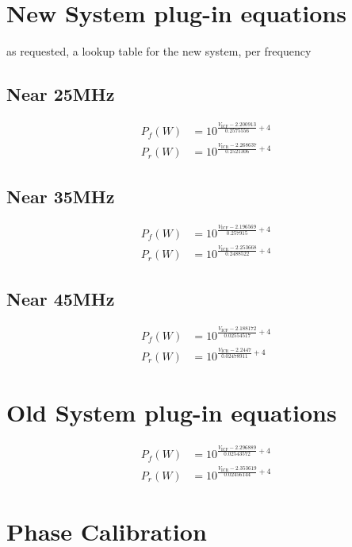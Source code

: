 \documentclass{report}
\begin{document}
\section{New System plug-in equations}
as requested, a lookup table for the new system, per frequency
\subsection{Near 25MHz}
\begin{eqnarray}
    P_f(W) &= 10^{\frac{V_{\text{ICF}}-2.200913}{0.2575556}+ 4}\\
    P_r(W) &= 10^{\frac{V_{\text{ICR}}-2.268637}{0.2521306}+ 4}
\end{eqnarray}
\subsection{Near 35MHz}
\begin{eqnarray}
    P_f(W) &= 10^{\frac{V_{\text{ICF}}-2.196569}{0.257915} + 4}\\
    P_r(W) &= 10^{\frac{V_{\text{ICR}}-2.253668}{0.2488522} + 4}
\end{eqnarray}
\subsection{Near 45MHz}
\begin{eqnarray}
    P_f(W) &= 10^{\frac{V_{\text{ICF}}-2.188172}{0.02554517} + 4}\\
    P_r(W) &= 10^{\frac{V_{\text{ICR}}-2.2447}{0.02478911}+ 4}
\end{eqnarray}
\section{Old System plug-in equations}
\begin{eqnarray}
    P_f(W) &= 10^{\frac{V_{\text{ICF}}-2.296889}{0.02543572}+ 4}\\
    P_r(W) &= 10^{\frac{V_{\text{ICR}}-2.353619}{0.02456144}+ 4}
\end{eqnarray}
\newpage
\section{Phase Calibration}
\end{document}
